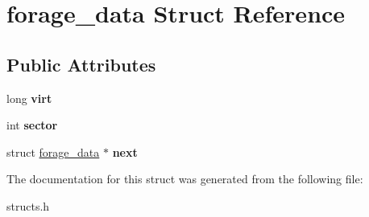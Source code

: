 \hypertarget{structforage__data}{\section{forage\-\_\-data Struct Reference}
\label{structforage__data}
}
\subsection*{Public Attributes}
\begin{DoxyCompactItemize}
\item 
\hypertarget{structforage__data_a5842f2ec3c9c1098cedf2b6414622b9c}{long {\bfseries virt}}\label{structforage__data_a5842f2ec3c9c1098cedf2b6414622b9c}

\item 
\hypertarget{structforage__data_a88cfe645d385eba299dfcd8c5a6eefe3}{int {\bfseries sector}}\label{structforage__data_a88cfe645d385eba299dfcd8c5a6eefe3}

\item 
\hypertarget{structforage__data_a60997418749e979e7dc569d39083e4b1}{struct \hyperlink{structforage__data}{forage\-\_\-data} $\ast$ {\bfseries next}}\label{structforage__data_a60997418749e979e7dc569d39083e4b1}

\end{DoxyCompactItemize}


The documentation for this struct was generated from the following file\-:\begin{DoxyCompactItemize}
\item 
structs.\-h\end{DoxyCompactItemize}
